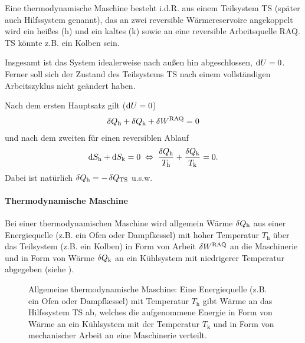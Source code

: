 Eine thermodynamische Maschine besteht i.d.R. aus einem Teilsystem TS (später auch Hilfssystem genannt), das an zwei reversible Wärmereservoire angekoppelt wird \textendash{} ein heißes (h) und ein kaltes (k) \textendash{} sowie an eine reversible Arbeitsquelle RAQ. TS könnte z.B. ein Kolben sein.  

Insgesamt ist das System idealerweise nach außen hin abgeschlossen, $\mathop{}\!\mathrm{d} U=0$. Ferner soll sich der Zustand des Teilsystems TS nach einem vollständigen Arbeitszyklus nicht geändert haben. 

Nach dem ersten Hauptsatz gilt ($\mathop{}\!\mathrm{d} U=0$)
\begin{align}
    \label{eq:maschine_HS1}
    \mathop{}\!\delta Q_\mathrm{h} +\mathop{}\!\delta Q_\mathrm{k} + \mathop{}\!\delta W^\mathrm{RAQ} = 0
\end{align}
und nach dem zweiten für einen reversiblen Ablauf 
\begin{align}
    \label{eq:maschine_HS2}
    \mathop{}\!\mathrm{d} S_\mathrm{h} + \mathop{}\!\mathrm{d} S_\mathrm{k} = 0 \;\Leftrightarrow\; \frac{\mathop{}\!\delta Q_\mathrm{h}}{T_\mathrm{h}} + \frac{\mathop{}\!\delta Q_\mathrm{k}}{T_\mathrm{k}} = 0. 
\end{align}
Dabei ist natürlich $\mathop{}\!\delta Q_\mathrm{h}=-\mathop{}\!\delta Q_\mathrm{TS}$ u.s.w. 

\paragraph*{Thermodynamische Maschine}

Bei einer thermodynamischen Maschine wird allgemein Wärme $\mathop{}\!\delta Q_\mathrm{h}$ aus einer Energiequelle (z.B. ein Ofen oder Dampfkessel) mit hoher Temperatur $T_\mathrm{h}$ über das Teilsystem (z.B. ein Kolben) in Form von Arbeit $\mathop{}\!\delta W^\mathrm{RAQ}$ an die Maschinerie und in Form von Wärme $\mathop{}\!\delta Q_\mathrm{k}$ an ein Kühlsystem mit niedrigerer Temperatur abgegeben (siehe ). 

\begin{figure}[htbp]
    \centering
    \tfigThermodynamicMaschine
    \caption{Allgemeine thermodynamische Maschine: Eine Energiequelle (z.B. ein Ofen oder Dampfkessel) mit Temperatur $T_\mathrm{h}$ gibt Wärme an das Hilfssystem TS ab, welches die aufgenommene Energie in Form von Wärme an ein Kühlsystem mit der Temperatur $T_\mathrm{k}$ und in Form von mechanischer Arbeit an eine Maschinerie verteilt. }
    \label{fig:ThermodynamicMaschine}
\end{figure}

